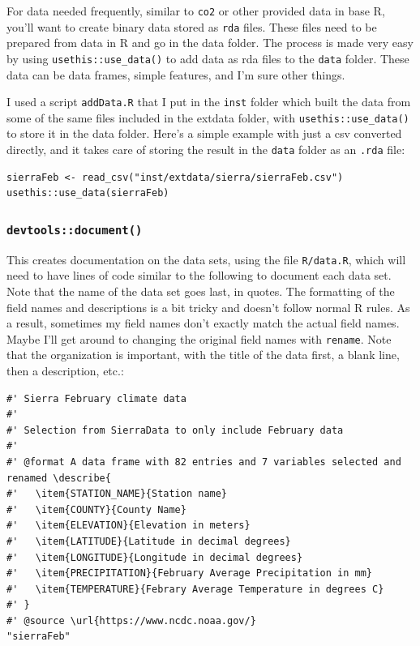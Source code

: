 \documentclass[
]{book}
\begin{document}
For data needed frequently, similar to \texttt{co2} or other provided data in base R, you'll want to create binary data stored as \texttt{rda} files. These files need to be prepared from data in R and go in the data folder. The process is made very easy by using \texttt{usethis::use\_data()} to add data as rda files to the \texttt{data} folder. These data can be data frames, simple features, and I'm sure other things.

I used a script \texttt{addData.R} that I put in the \texttt{inst} folder which built the data from some of the same files included in the extdata folder, with \texttt{usethis::use\_data()} to store it in the data folder. Here's a simple example with just a csv converted directly, and it takes care of storing the result in the \texttt{data} folder as an \texttt{.rda} file:

\begin{verbatim}
sierraFeb <- read_csv("inst/extdata/sierra/sierraFeb.csv")
usethis::use_data(sierraFeb)
\end{verbatim}

\hypertarget{devtoolsdocument}{%
\subsubsection{\texorpdfstring{\texttt{devtools::document()}}{devtools::document()}}\label{devtoolsdocument}}

This creates documentation on the data sets, using the file \texttt{R/data.R}, which will need to have lines of code similar to the following to document each data set. Note that the name of the data set goes last, in quotes. The formatting of the field names and descriptions is a bit tricky and doesn't follow normal R rules. As a result, sometimes my field names don't exactly match the actual field names. Maybe I'll get around to changing the original field names with \texttt{rename}. Note that the organization is important, with the title of the data first, a blank line, then a description, etc.:

\begin{verbatim}
#' Sierra February climate data
#'
#' Selection from SierraData to only include February data
#'
#' @format A data frame with 82 entries and 7 variables selected and renamed \describe{
#'   \item{STATION_NAME}{Station name}
#'   \item{COUNTY}{County Name}
#'   \item{ELEVATION}{Elevation in meters}
#'   \item{LATITUDE}{Latitude in decimal degrees}
#'   \item{LONGITUDE}{Longitude in decimal degrees}
#'   \item{PRECIPITATION}{February Average Precipitation in mm}
#'   \item{TEMPERATURE}{Febrary Average Temperature in degrees C}
#' }
#' @source \url{https://www.ncdc.noaa.gov/}
"sierraFeb"
\end{verbatim}
\end{document}
